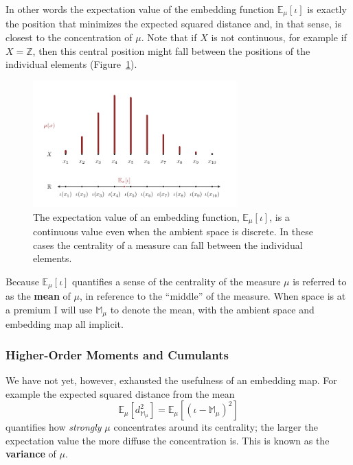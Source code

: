 \documentclass[
  letterpaper,
  DIV=11,
  numbers=noendperiod]{scrartcl}
\begin{document}
In other words the expectation value of the embedding function
\(\mathbb{E}_{\mu} [ \iota ]\) is exactly the position that minimizes
the expected squared distance and, in that sense, is closest to the
concentration of \(\mu\). Note that if \(X\) is not continuous, for
example if \(X = \mathbb{Z}\), then this central position might fall
between the positions of the individual elements
(Figure~\ref{fig-mean}).

\begin{figure}

{\centering \includegraphics[width=0.7\textwidth,height=\textheight]{figures/mean/mean.pdf}

}

\caption{\label{fig-mean}The expectation value of an embedding function,
\(\mathbb{E}_{\mu} [ \iota ]\), is a continuous value even when the
ambient space is discrete. In these cases the centrality of a measure
can fall between the individual elements.}

\end{figure}

Because \(\mathbb{E}_{\mu} \left[ \iota \right]\) quantifies a sense of
the centrality of the measure \(\mu\) is referred to as the
\textbf{mean} of \(\mu\), in reference to the ``middle'' of the measure.
When space is at a premium I will use \(\mathbb{M}_{\mu}\) to denote the
mean, with the ambient space and embedding map all implicit.

\hypertarget{higher-order-moments-and-cumulants}{%
\subsubsection{Higher-Order Moments and
Cumulants}\label{higher-order-moments-and-cumulants}}

We have not yet, however, exhausted the usefulness of an embedding map.
For example the expected squared distance from the mean \[
\mathbb{E}_{\mu} \left[ d_{\mathbb{M}_{\mu}}^{2} \right]
=
\mathbb{E}_{\mu} \left[ (\iota - \mathbb{M}_{\mu})^{2} \right]
\] quantifies how \emph{strongly} \(\mu\) concentrates around its
centrality; the larger the expectation value the more diffuse the
concentration is. This is known as the \textbf{variance} of \(\mu\).
\end{document}
